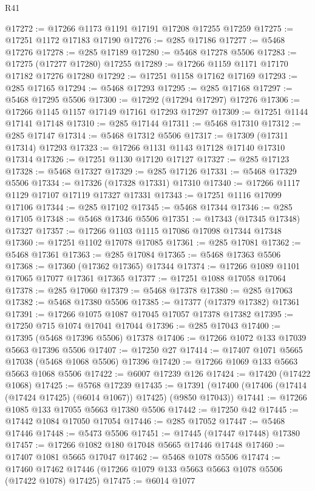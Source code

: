 \begin{lexlean}{R41}
\begin{coremodule}
@17272 := @17266 @1173 @1191 @17191 @17208 @17255 @17259
@17275 := @17251 @1172 @17183 @17190
@17276 := @285 @17186
@17277 := @5468 @17276
@17278 := @285 @17189
@17280 := @5468 @17278 @5506
@17283 := @17275 (@17277 @17280) @17255
@17289 := @17266 @1159 @1171 @17170 @17182 @17276 @17280
@17292 := @17251 @1158 @17162 @17169
@17293 := @285 @17165
@17294 := @5468 @17293
@17295 := @285 @17168
@17297 := @5468 @17295 @5506
@17300 := @17292 (@17294 @17297) @17276
@17306 := @17266 @1145 @1157 @17149 @17161 @17293 @17297
@17309 := @17251 @1144 @17141 @17148
@17310 := @285 @17144
@17311 := @5468 @17310
@17312 := @285 @17147
@17314 := @5468 @17312 @5506
@17317 := @17309 (@17311 @17314) @17293
@17323 := @17266 @1131 @1143 @17128 @17140 @17310 @17314
@17326 := @17251 @1130 @17120 @17127
@17327 := @285 @17123
@17328 := @5468 @17327
@17329 := @285 @17126
@17331 := @5468 @17329 @5506
@17334 := @17326 (@17328 @17331) @17310
@17340 := @17266 @1117 @1129 @17107 @17119 @17327 @17331
@17343 := @17251 @1116 @17099 @17106
@17344 := @285 @17102
@17345 := @5468 @17344
@17346 := @285 @17105
@17348 := @5468 @17346 @5506
@17351 := @17343 (@17345 @17348) @17327
@17357 := @17266 @1103 @1115 @17086 @17098 @17344 @17348
@17360 := @17251 @1102 @17078 @17085
@17361 := @285 @17081
@17362 := @5468 @17361
@17363 := @285 @17084
@17365 := @5468 @17363 @5506
@17368 := @17360 (@17362 @17365) @17344
@17374 := @17266 @1089 @1101 @17065 @17077 @17361 @17365
@17377 := @17251 @1088 @17058 @17064
@17378 := @285 @17060
@17379 := @5468 @17378
@17380 := @285 @17063
@17382 := @5468 @17380 @5506
@17385 := @17377 (@17379 @17382) @17361
@17391 := @17266 @1075 @1087 @17045 @17057 @17378 @17382
@17395 := @17250 @715 @1074 @17041 @17044
@17396 := @285 @17043
@17400 := @17395 (@5468 @17396 @5506) @17378
@17406 := @17266 @1072 @133 @17039 @5663 @17396 @5506
@17407 := @17250 @27
@17414 := @17407 @1071 @5665 @17038 (@5468 @1068 @5506) @17396
@17420 := @17266 @1069 @133 @5663 @5663 @1068 @5506
@17422 := @6007 @17239 @126
@17424 := @17420 (@17422 @1068)
@17425 := @5768 @17239
@17435 := @17391 (@17400 (@17406 (@17414 (@17424 @17425) (@6014 @1067)) @17425) (@9850 @17043))
@17441 := @17266 @1085 @133 @17055 @5663 @17380 @5506
@17442 := @17250 @42
@17445 := @17442 @1084 @17050 @17054
@17446 := @285 @17052
@17447 := @5468 @17446
@17448 := @5473 @5506
@17451 := @17445 (@17447 @17448) @17380
@17457 := @17266 @1082 @180 @17048 @5665 @17446 @17448
@17460 := @17407 @1081 @5665 @17047
@17462 := @5468 @1078 @5506
@17474 := @17460 @17462 @17446 (@17266 @1079 @133 @5663 @5663 @1078 @5506 (@17422 @1078) @17425)
@17475 := @6014 @1077

\end{coremodule}
\end{lexlean}

